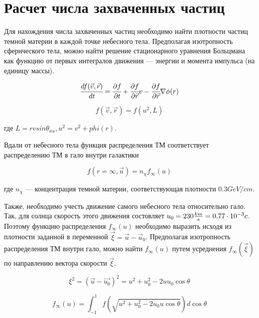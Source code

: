 \section{Расчет числа захваченных частиц}

Для нахождения числа захваченных частиц необходимо найти плотности частиц
темной материи в каждой точке небесного тела. Предполагая изотропность 
сферического тела, можно найти решение стационарного уравнения Больцмана как функцию от 
первых интегралов движения --- энергии и момента импульса (на единицу массы).

\begin{equation}
	\label{boltsman_capt}
	\cfrac{d f(\vec{v},\vec{r})}{d t} = \cfrac{\partial f}{\partial t}+
	\cfrac{\partial f}{\partial \vec{r}}v - \cfrac{\partial f}{\partial \vec{r}}\nabla\phi(r)
\end{equation}


\begin{equation}
	f(\vec{v},\vec{r}) = f(u^2,L)
\end{equation}

где $L = rv sin \theta_{nu}, u^2 = v^2 + phi(r)$. 

Вдали от небесного тела функция распределения ТМ соответствует распределению ТМ
в гало внутри галактики 

\begin{equation}
	f(r=\infty,\vec{u}) = n_{\chi}f_{\infty}(u)
\end{equation}

где $n_{\chi}$ --- концентрация темной материи, соответствующая плотности $0.3 GeV/cm$.

Также, необходимо учесть движение самого небесного тела относительно гало. 
Так, для солнца скорость этого движения состовляет $u_0 = 230 \frac{km}{s} = {0.77}\cdot 10^{-3} c$.
Поэтому функцию распределения $f_{\infty}(u)$ необходимо выразить исходя из плотности 
заданной в переменной $\vec{\xi} = \vec{u} - \vec{u}_0$. 
Предполагая изотропность распределения ТМ внутри гало, можно найти $f_{\infty}(u)$
путем усреднения $f_{\infty}(\vec{\xi})$ по направлению вектора скорости $\vec{\xi}$.

\begin{equation}
	\xi^2 = (\vec{u} - \vec{u_0})^2 = u^2 + u_0^2 - 2 u u_0 \cos{\theta}
\end{equation}

\begin{equation}
	f_{\infty}(u) =
	 \int_{-1}^{1} f\left(\sqrt{u^2+u_0^2-2u_0 u \cos{\theta}}\right)
	 d \cos{\theta}
\end{equation}

